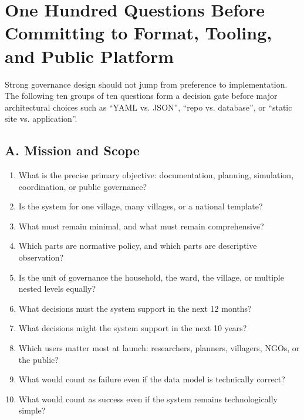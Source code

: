\documentclass[11pt,a4paper]{article}
\begin{document}
\section{One Hundred Questions Before Committing to Format, Tooling, and Public Platform}

Strong governance design should not jump from preference to implementation. The following ten groups of ten questions form a 
decision gate before major architectural choices such as ``YAML vs. JSON'', ``repo vs. database'', or ``static site vs. application''.

\subsection{A. Mission and Scope}
\begin{enumerate}
    \item What is the precise primary objective: documentation, planning, simulation, coordination, or public governance?
    \item Is the system for one village, many villages, or a national template?
    \item What must remain minimal, and what must remain comprehensive?
    \item Which parts are normative policy, and which parts are descriptive observation?
    \item Is the unit of governance the household, the ward, the village, or multiple nested levels equally?
    \item What decisions must the system support in the next 12 months?
    \item What decisions might the system support in the next 10 years?
    \item Which users matter most at launch: researchers, planners, villagers, NGOs, or the public?
    \item What would count as failure even if the data model is technically correct?
    \item What would count as success even if the system remains technologically simple?
\end{enumerate}
\end{document}
